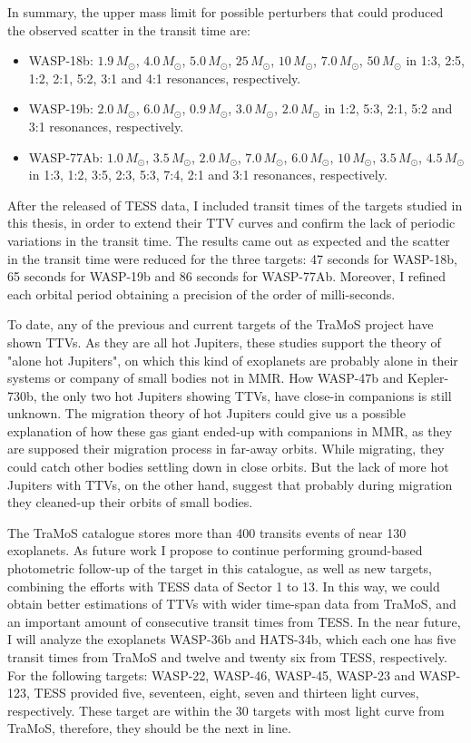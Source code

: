 In summary, the upper mass limit for possible perturbers that could produced the observed scatter in the transit time are:
\begin{itemize}
\item WASP-18b: $1.9\,M_{\odot}$, $4.0\,M_{\odot}$, $5.0\,M_{\odot}$, $25\,M_{\odot}$, $10\,M_{\odot}$, $7.0\,M_{\odot}$, $50\,M_{\odot}$ in 1:3, 2:5, 1:2, 2:1, 5:2, 3:1 and 4:1 resonances, respectively. 
\item WASP-19b: $2.0\,M_{\odot}$, $6.0\,M_{\odot}$, $0.9\,M_{\odot}$, $3.0\,M_{\odot}$, $2.0\,M_{\odot}$ in 1:2, 5:3, 2:1, 5:2 and 3:1 resonances, respectively. 
\item WASP-77Ab: $1.0\,M_{\odot}$, $3.5\,M_{\odot}$, $2.0\,M_{\odot}$, $7.0\,M_{\odot}$, $6.0\,M_{\odot}$, $10\,M_{\odot}$, $3.5\,M_{\odot}$, $4.5\,M_{\odot}$ in 1:3, 1:2, 3:5, 2:3, 5:3, 7:4, 2:1 and 3:1 resonances, respectively.
\end{itemize}

After the released of TESS data, I included transit times of the targets studied in this thesis, in order to extend their TTV curves and confirm the lack of periodic variations in the transit time. The results came out as expected and the scatter in the transit time were reduced for the three targets: 47 seconds for WASP-18b, 65 seconds for WASP-19b and 86 seconds for WASP-77Ab. Moreover, I refined each orbital period obtaining a precision of the order of milli-seconds. 

To date, any of the previous and current targets of the TraMoS project have shown TTVs. As they are all hot Jupiters, these studies support the theory of "alone hot Jupiters", on which this kind of exoplanets are probably alone in their systems or company of small bodies not in MMR. How WASP-47b and Kepler-730b, the only two hot Jupiters showing TTVs, have close-in companions is still unknown. The migration theory of hot Jupiters could give us a possible explanation of how these gas giant ended-up with companions in MMR, as they are supposed their migration process in far-away orbits. While migrating, they could catch other bodies settling down in close orbits. But the lack of more hot Jupiters with TTVs, on the other hand, suggest that probably during migration they cleaned-up their orbits of small bodies. 

The TraMoS catalogue stores more than 400 transits events of near 130 exoplanets. As future work I propose to continue performing ground-based photometric follow-up of the target in this catalogue, as well as new targets, combining the efforts with TESS data of Sector 1 to 13. In this way, we could obtain better estimations of TTVs with wider time-span data from TraMoS, and an important amount of consecutive transit times from TESS. In the near future, I will analyze the exoplanets WASP-36b and HATS-34b, which each one has five transit times from TraMoS and twelve and twenty six from TESS, respectively. For the following targets: WASP-22, WASP-46, WASP-45, WASP-23 and WASP-123, TESS provided five, seventeen, eight, seven and thirteen light curves, respectively. These target are within the 30 targets with most light curve from TraMoS, therefore, they should be the next in line.

